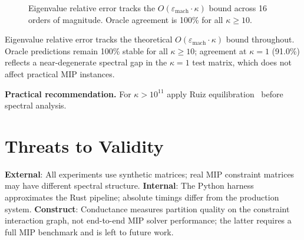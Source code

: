 \documentclass[11pt]{article}
\begin{document}
\begin{figure}[h]
\centering
{}
\caption{Eigenvalue relative error tracks the $O(\varepsilon_{\mathrm{mach}} \cdot \kappa)$ bound across 16 orders of magnitude. Oracle agreement is 100\% for all $\kappa \geq 10$.}
\label{fig:stability}
\end{figure}

Eigenvalue relative error tracks the theoretical $O(\varepsilon_{\mathrm{mach}} \cdot \kappa)$ bound throughout. Oracle predictions remain 100\% stable for all $\kappa \geq 10$; agreement at $\kappa=1$ (91.0\%) reflects a near-degenerate spectral gap in the $\kappa=1$ test matrix, which does not affect practical MIP instances.

\textbf{Practical recommendation.} For $\kappa > 10^{11}$ apply Ruiz equilibration~\cite{ruiz2001} before spectral analysis.

\section{Threats to Validity}
\label{sec:threats}

\textbf{External}: All experiments use synthetic matrices; real MIP constraint matrices may have different spectral structure. \textbf{Internal}: The Python harness approximates the Rust pipeline; absolute timings differ from the production system. \textbf{Construct}: Conductance measures partition quality on the constraint interaction graph, not end-to-end MIP solver performance; the latter requires a full MIP benchmark and is left to future work.
\end{document}
